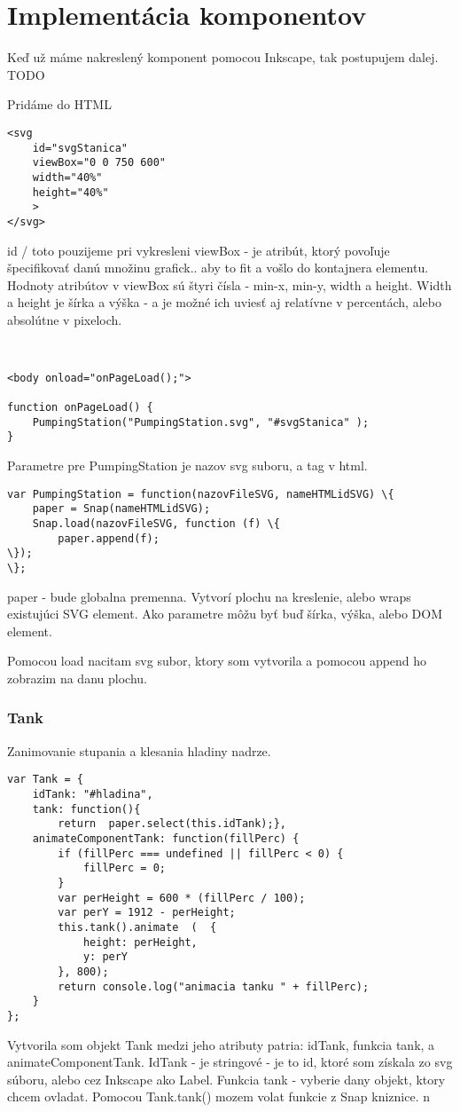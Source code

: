 \chapter{Implementácia komponentov}

Keď už máme nakreslený komponent pomocou Inkscape, tak postupujem dalej. TODO

Pridáme do HTML  
\begin{lstlisting}
<svg  
	id="svgStanica"  
	viewBox="0 0 750 600" 
	width="40%" 
	height="40%" 
	>
</svg>
\end{lstlisting}


id / toto pouzijeme pri vykresleni 
viewBox - je atribút, ktorý povoľuje špecifikovať danú množinu grafick.. aby to fit a vošlo do kontajnera elementu. Hodnoty atribútov v viewBox sú štyri čísla - min-x, min-y, width a height. 
Width a height je šírka a výška - a je možné ich uviesť aj relatívne v percentách, alebo absolútne v pixeloch. 

\begin{lstlisting}


<body onload="onPageLoad();">

function onPageLoad() {
	PumpingStation("PumpingStation.svg", "#svgStanica" );
}
\end{lstlisting}
Parametre pre PumpingStation je nazov svg suboru, a tag v html.
\begin{lstlisting}
var PumpingStation = function(nazovFileSVG, nameHTMLidSVG) \{
	paper = Snap(nameHTMLidSVG);
	Snap.load(nazovFileSVG, function (f) \{
		paper.append(f);
\});
\};
\end{lstlisting}
paper - bude globalna premenna. Vytvorí plochu na  kreslenie, alebo  wraps existujúci SVG element. Ako parametre môžu byť buď šírka, výška, alebo DOM element. 

Pomocou load nacitam svg subor, ktory som vytvorila a pomocou append ho zobrazim na danu plochu. 

\subsection{Tank}
Zanimovanie stupania a klesania hladiny nadrze. 
\begin{lstlisting}
var Tank = {
	idTank: "#hladina",
	tank: function(){
		return  paper.select(this.idTank);},
	animateComponentTank: function(fillPerc) {
		if (fillPerc === undefined || fillPerc < 0) {
			fillPerc = 0;
		}
		var perHeight = 600 * (fillPerc / 100);
		var perY = 1912 - perHeight;
		this.tank().animate  (	{
			height: perHeight,
			y: perY
		}, 800);
		return console.log("animacia tanku " + fillPerc);
	}
};
\end{lstlisting}
Vytvorila som objekt Tank medzi jeho atributy patria: idTank, funkcia tank, a animateComponentTank. IdTank - je stringové - je to id, ktoré som získala zo svg súboru, alebo cez Inkscape ako Label. Funkcia tank - vyberie dany objekt, ktory chcem ovladat. Pomocou Tank.tank() mozem volat funkcie z Snap kniznice. n 

